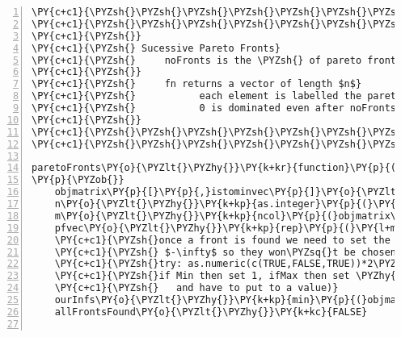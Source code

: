 \begin{Verbatim}[commandchars=\\\{\},codes={\catcode`\$=3\catcode`\^=7\catcode`\_=8},gobble=0,numbers=left,fontfamily=fvm,fontshape=n,fontsize=\footnotesize,tabsize=2]
\PY{c+c1}{\PYZsh{}\PYZsh{}\PYZsh{}\PYZsh{}\PYZsh{}\PYZsh{}\PYZsh{}\PYZsh{}\PYZsh{}\PYZsh{}\PYZsh{}\PYZsh{}\PYZsh{}\PYZsh{}\PYZsh{}\PYZsh{}\PYZsh{}\PYZsh{}\PYZsh{}\PYZsh{}\PYZsh{}\PYZsh{}\PYZsh{}\PYZsh{}\PYZsh{}\PYZsh{}\PYZsh{}\PYZsh{}\PYZsh{}\PYZsh{}\PYZsh{}\PYZsh{}\PYZsh{}\PYZsh{}\PYZsh{}\PYZsh{}\PYZsh{}\PYZsh{}\PYZsh{}\PYZsh{}\PYZsh{}\PYZsh{}}
\PY{c+c1}{\PYZsh{}\PYZsh{}\PYZsh{}\PYZsh{}\PYZsh{}\PYZsh{}\PYZsh{}\PYZsh{}\PYZsh{}\PYZsh{}\PYZsh{}\PYZsh{}\PYZsh{}\PYZsh{}\PYZsh{}\PYZsh{}\PYZsh{}\PYZsh{}\PYZsh{}\PYZsh{}\PYZsh{}\PYZsh{}\PYZsh{}\PYZsh{}\PYZsh{}\PYZsh{}\PYZsh{}\PYZsh{}\PYZsh{}\PYZsh{}\PYZsh{}\PYZsh{}\PYZsh{}\PYZsh{}\PYZsh{}\PYZsh{}\PYZsh{}\PYZsh{}\PYZsh{}\PYZsh{}\PYZsh{}\PYZsh{}}
\PY{c+c1}{\PYZsh{}}
\PY{c+c1}{\PYZsh{} Sucessive Pareto Fronts}
\PY{c+c1}{\PYZsh{}     noFronts is the \PYZsh{} of pareto fronts required}
\PY{c+c1}{\PYZsh{}}
\PY{c+c1}{\PYZsh{}     fn returns a vector of length $n$}
\PY{c+c1}{\PYZsh{}           each element is labelled the pareto front \PYZsh{},  }
\PY{c+c1}{\PYZsh{}           0 is dominated even after noFronts found}
\PY{c+c1}{\PYZsh{}}
\PY{c+c1}{\PYZsh{}\PYZsh{}\PYZsh{}\PYZsh{}\PYZsh{}\PYZsh{}\PYZsh{}\PYZsh{}\PYZsh{}\PYZsh{}\PYZsh{}\PYZsh{}\PYZsh{}\PYZsh{}\PYZsh{}\PYZsh{}\PYZsh{}\PYZsh{}\PYZsh{}\PYZsh{}\PYZsh{}\PYZsh{}\PYZsh{}\PYZsh{}\PYZsh{}\PYZsh{}\PYZsh{}\PYZsh{}\PYZsh{}\PYZsh{}\PYZsh{}\PYZsh{}\PYZsh{}\PYZsh{}\PYZsh{}\PYZsh{}\PYZsh{}\PYZsh{}\PYZsh{}\PYZsh{}\PYZsh{}\PYZsh{}}
\PY{c+c1}{\PYZsh{}\PYZsh{}\PYZsh{}\PYZsh{}\PYZsh{}\PYZsh{}\PYZsh{}\PYZsh{}\PYZsh{}\PYZsh{}\PYZsh{}\PYZsh{}\PYZsh{}\PYZsh{}\PYZsh{}\PYZsh{}\PYZsh{}\PYZsh{}\PYZsh{}\PYZsh{}\PYZsh{}\PYZsh{}\PYZsh{}\PYZsh{}\PYZsh{}\PYZsh{}\PYZsh{}\PYZsh{}\PYZsh{}\PYZsh{}\PYZsh{}\PYZsh{}\PYZsh{}\PYZsh{}\PYZsh{}\PYZsh{}\PYZsh{}\PYZsh{}\PYZsh{}\PYZsh{}\PYZsh{}\PYZsh{}}

paretoFronts\PY{o}{\PYZlt{}\PYZhy{}}\PY{k+kr}{function}\PY{p}{(}noFronts\PY{p}{,}objmatrix\PY{p}{,}istominvec\PY{p}{)}
\PY{p}{\PYZob{}}
	objmatrix\PY{p}{[}\PY{p}{,}istominvec\PY{p}{]}\PY{o}{\PYZlt{}\PYZhy{}} \PY{o}{\PYZhy{}}objmatrix\PY{p}{[}\PY{p}{,}istominvec\PY{p}{]}
	n\PY{o}{\PYZlt{}\PYZhy{}}\PY{k+kp}{as.integer}\PY{p}{(}\PY{k+kp}{nrow}\PY{p}{(}objmatrix\PY{p}{)}\PY{p}{)}
	m\PY{o}{\PYZlt{}\PYZhy{}}\PY{k+kp}{ncol}\PY{p}{(}objmatrix\PY{p}{)}
	pfvec\PY{o}{\PYZlt{}\PYZhy{}}\PY{k+kp}{rep}\PY{p}{(}\PY{l+m}{0}\PY{p}{,}n\PY{p}{)} \PY{c+c1}{\PYZsh{}output vector}
	\PY{c+c1}{\PYZsh{}once a front is found we need to set the correponding values to $\infty$ or }
	\PY{c+c1}{\PYZsh{} $-\infty$ so they won\PYZsq{}t be chosen again}
	\PY{c+c1}{\PYZsh{}try: as.numeric(c(TRUE,FALSE,TRUE))*2\PYZhy{}1 to see what the next line is doing}
	\PY{c+c1}{\PYZsh{}if Min then set 1, ifMax then set \PYZhy{}1 (the sign of the Inf if we find front }
	\PY{c+c1}{\PYZsh{}	 and have to put to a value)}
	ourInfs\PY{o}{\PYZlt{}\PYZhy{}}\PY{k+kp}{min}\PY{p}{(}objmatrix\PY{p}{)}\PY{l+m}{\PYZhy{}1}
	allFrontsFound\PY{o}{\PYZlt{}\PYZhy{}}\PY{k+kc}{FALSE}
	

\end{Verbatim}
